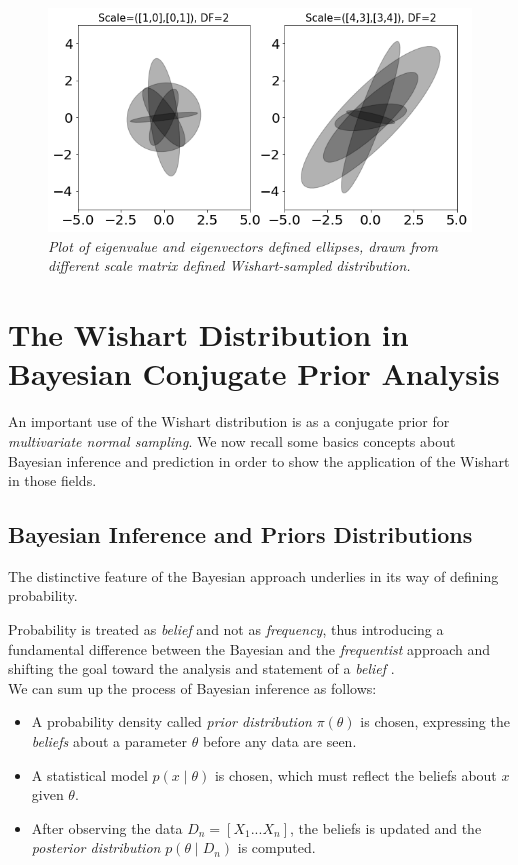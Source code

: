 \documentclass[12pt,openright,twoside,a4paper]{book}
\begin{document}
\begin{figure}[!h]
\centering
\includegraphics[scale=0.37]{wisheig-df2}
\caption{\textit{Plot of eigenvalue and eigenvectors defined ellipses, drawn from different scale matrix defined Wishart-sampled distribution.}}
\label{Wish-eig}
\end{figure}

\section{The Wishart Distribution in Bayesian Conjugate Prior Analysis}

An important use of the Wishart distribution is as a conjugate prior for \textit{multivariate normal sampling}. We now recall some basics concepts about Bayesian inference and prediction in order to show the application of the Wishart in those fields.

\subsection{Bayesian Inference and Priors Distributions}

The distinctive feature of the Bayesian approach underlies in its way of defining probability.

Probability is treated as \textit{belief} and not as \textit{frequency}, thus introducing a fundamental difference between the Bayesian and the \textit{frequentist} approach and shifting the goal toward the analysis and statement of a \textit{belief} \cite{SML}.
\\[12pt]
We can sum up the process of Bayesian inference as follows:
\begin{itemize}
\item A probability density called \textit{prior distribution} $\pi(\theta)$ is chosen, expressing the \textit{beliefs} about a parameter $\theta$ before any data are seen.
\item A statistical model $p(x\mid \theta)$ is chosen, which must reflect the beliefs about $x$ given $\theta$.
\item After observing the data $D_n=[X_1...X_n]$, the beliefs is updated and the \textit{posterior distribution} $p(\theta\mid D_n)$ is computed.
\end{itemize}
\end{document}
